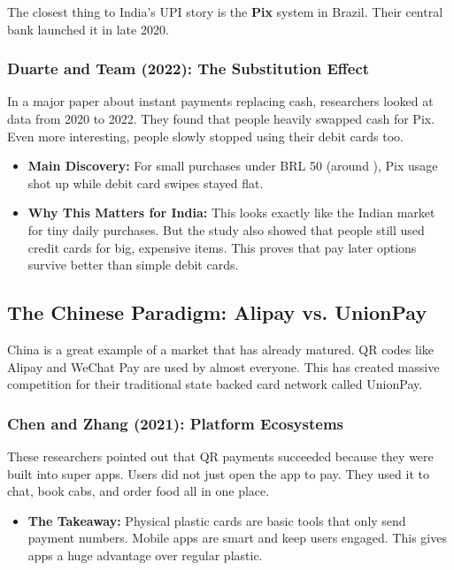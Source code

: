 The closest thing to India's UPI story is the \textbf{Pix} system in Brazil. Their central bank launched it in late 2020.

\subsubsection{Duarte and Team (2022): The Substitution Effect}

In a major paper about instant payments replacing cash, researchers looked at data from 2020 to 2022. They found that people heavily swapped cash for Pix. Even more interesting, people slowly stopped using their debit cards too.

\begin{itemize}
    \item \textbf{Main Discovery:} For small purchases under BRL 50 (around ), Pix usage shot up while debit card swipes stayed flat.
    \item \textbf{Why This Matters for India:} This looks exactly like the Indian market for tiny daily purchases. But the study also showed that people still used credit cards for big, expensive items. This proves that pay later options survive better than simple debit cards.
\end{itemize}

\subsection{The Chinese Paradigm: Alipay vs. UnionPay}

China is a great example of a market that has already matured. QR codes like Alipay and WeChat Pay are used by almost everyone. This has created massive competition for their traditional state backed card network called UnionPay.

\subsubsection{Chen and Zhang (2021): Platform Ecosystems}

These researchers pointed out that QR payments succeeded because they were built into super apps. Users did not just open the app to pay. They used it to chat, book cabs, and order food all in one place.

\begin{itemize}
    \item \textbf{The Takeaway:} Physical plastic cards are basic tools that only send payment numbers. Mobile apps are smart and keep users engaged. This gives apps a huge advantage over regular plastic.
\end{itemize}

